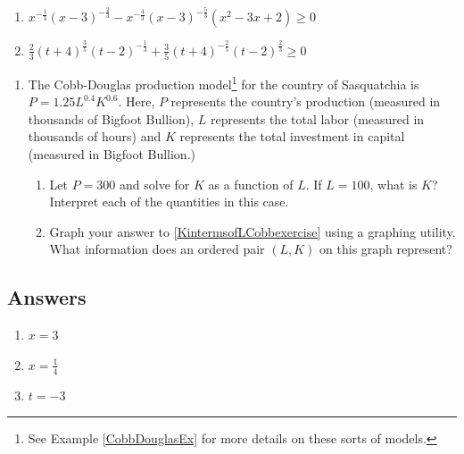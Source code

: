 \documentclass{ximera}
\begin{document}
\begin{enumerate}
\setcounter{enumi}{\value{HW}}


\item $x^{-\frac{1}{3}} (x-3)^{-\frac{2}{3}} - x^{-\frac{4}{3}} (x-3)^{-\frac{5}{3}} (x^2-3x+2) \geq 0$  
\item $\frac{2}{3}(t + 4)^{\frac{3}{5}}(t - 2)^{-\frac{1}{3}} + \frac{3}{5}(t + 4)^{-\frac{2}{5}}(t - 2)^{\frac{2}{3}} \geq 0$ \label{powereqineqexlasta}

\setcounter{HW}{\value{enumi}}
\end{enumerate}




\begin{enumerate}
\setcounter{enumi}{\value{HW}}
\item The Cobb-Douglas production model\footnote{See Example \ref{CobbDouglasEx} for more details on these sorts of models.} for the country of Sasquatchia is $P = 1.25L^{0.4}K^{0.6}$.  Here, $P$ represents the country's production (measured in thousands of Bigfoot  Bullion), $L$ represents the total labor (measured in thousands of hours) and $K$ represents the total investment in capital (measured in Bigfoot Bullion.)

\begin{enumerate}

\item \label{KintermsofLCobbexercise}Let $P = 300$ and solve for $K$ as a function of  $L$.  If $L = 100$, what is $K$?  Interpret each of the quantities in this case.

\item Graph your answer to \ref{KintermsofLCobbexercise} using a graphing utility.  What information does an ordered pair $(L, K)$ on this graph represent?  

\end{enumerate}

\end{enumerate}

\newpage

\subsection{Answers}

\begin{multicols}{3}
\begin{enumerate}


\item $x=3$  
\item  $x = \frac{1}{4}$
\item  $t=-3$  

\setcounter{HW}{\value{enumi}}
\end{enumerate}
\end{multicols}
\end{document}
